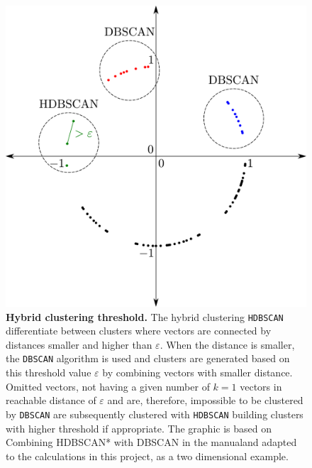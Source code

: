 \begin{figure}[!hbt]
    \centering
    \includegraphics[width=\textwidth]{Graphics/Hybrid.pdf}
    \caption[Hybrid clustering threshold]{\textbf{Hybrid clustering threshold.} The hybrid clustering \texttt{HDBSCAN} differentiate between clusters where vectors are connected by distances smaller and higher than $\varepsilon$. When the distance is smaller, the \texttt{DBSCAN} algorithm is used and clusters are generated based on this threshold value $\varepsilon$ by combining vectors with smaller distance. Omitted vectors, not having a given number of $k=1$ vectors in reachable distance of $\varepsilon$ and are, therefore, impossible to be clustered by \texttt{DBSCAN} are subsequently clustered with \texttt{HDBSCAN} building clusters with higher threshold if appropriate. The graphic is based on \glqq Combining HDBSCAN* with DBSCAN\grqq{} in the manual\footnotemark and adapted to the calculations in this project, as a two dimensional example.}
    \label{fig:Hybrid}
\end{figure}

